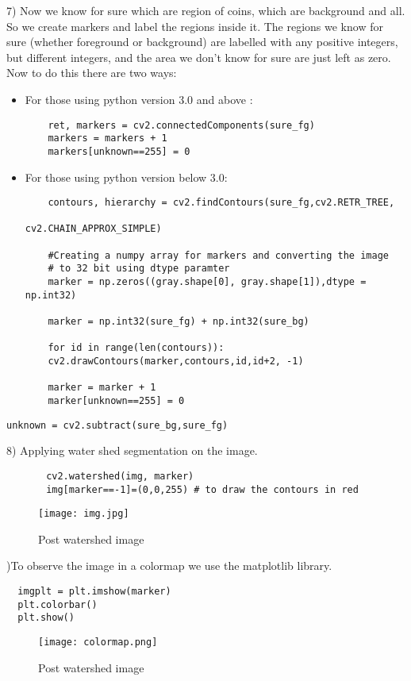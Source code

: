 \documentclass[]{article}
\begin{document}
7) Now we know for sure which are region of coins, which are background and all. So we create markers and label the regions inside it. The regions we know for sure (whether foreground or background) are labelled with any positive integers, but different integers, and the area we don’t know for sure are just left as zero. Now to do this there are two ways:
\begin{itemize}
	\item For those using python version 3.0 and above :
	\begin{verbatim}
	ret, markers = cv2.connectedComponents(sure_fg)
	markers = markers + 1
	markers[unknown==255] = 0
	\end{verbatim}
	\item For those using python version below 3.0:
	\begin{verbatim}
	contours, hierarchy = cv2.findContours(sure_fg,cv2.RETR_TREE,
	                                            cv2.CHAIN_APPROX_SIMPLE)
	
	#Creating a numpy array for markers and converting the image
	# to 32 bit using dtype paramter
	marker = np.zeros((gray.shape[0], gray.shape[1]),dtype = np.int32)
	
	marker = np.int32(sure_fg) + np.int32(sure_bg)
	
	for id in range(len(contours)):
	cv2.drawContours(marker,contours,id,id+2, -1)
	
	marker = marker + 1
	marker[unknown==255] = 0
	\end{verbatim}
\end{itemize}
\begin{verbatim}
unknown = cv2.subtract(sure_bg,sure_fg)
\end{verbatim}

8) Applying water shed segmentation on the image.
\begin{verbatim}
	   cv2.watershed(img, marker)
	   img[marker==-1]=(0,0,255) # to draw the contours in red 
\end{verbatim}
\begin{figure}[h]
	\centering
	\texttt{[image: img.jpg]}
	\caption{Post watershed image}
\end{figure}

)To observe the image in a colormap we use the matplotlib library.
\begin{verbatim}
  imgplt = plt.imshow(marker)
  plt.colorbar()
  plt.show()
\end{verbatim}
\begin{figure}[h]
	\centering
	\texttt{[image: colormap.png]}
	\caption{Post watershed image}
\end{figure}
\end{document}
